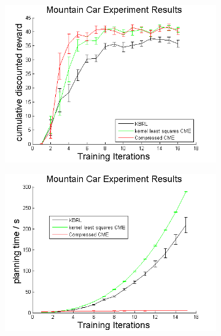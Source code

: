 \documentclass[letterpaper]{article}
\begin{document}
\begin{figure}[htb]
\centering
\begin{subfigure}[b]{0.3\textwidth}
\includegraphics[clip, width=\textwidth]{MCrewards.png}
\end{subfigure}
\begin{subfigure}[b]{0.3\textwidth}
\includegraphics[clip, width=\textwidth]{MCplanning.png}
\end{subfigure}
\begin{subfigure}[b]{0.3\textwidth}

\end{subfigure}
\end{figure}
\end{document}

